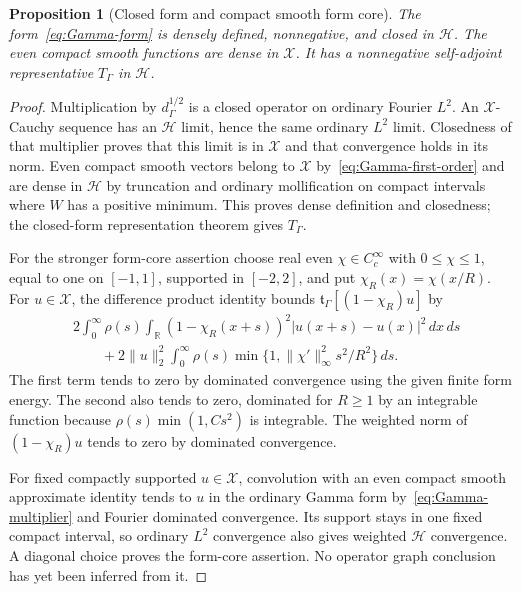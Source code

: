 \documentclass[11pt,a4paper]{article}
\numberwithin{equation}{section}
\newtheorem{proposition}[theorem]{Proposition}
\theoremstyle{definition}
\theoremstyle{remark}
\newcommand{\R}{\mathbb R}
\newcommand{\Hh}{\mathcal H}
\newcommand{\norm}[1]{\lVert #1\rVert}
\begin{document}
\begin{proposition}[Closed form and compact smooth form core]\label{prop:Gamma-form-core}
The form~\eqref{eq:Gamma-form} is densely defined, nonnegative, and closed in $\Hh$. The even compact smooth functions are dense in $\mathcal X$. It has a nonnegative self-adjoint representative $T_\Gamma$ in $\Hh$.
\end{proposition}
\begin{proof}
Multiplication by $d_\Gamma^{1/2}$ is a closed operator on ordinary Fourier $L^2$. An $\mathcal X$-Cauchy sequence has an $\Hh$ limit, hence the same ordinary $L^2$ limit. Closedness of that multiplier proves that this limit is in $\mathcal X$ and that convergence holds in its norm. Even compact smooth vectors belong to $\mathcal X$ by~\eqref{eq:Gamma-first-order} and are dense in $\Hh$ by truncation and ordinary mollification on compact intervals where $W$ has a positive minimum. This proves dense definition and closedness; the closed-form representation theorem gives $T_\Gamma$.

For the stronger form-core assertion choose real even $\chi\in C_c^\infty$ with $0\le\chi\le1$, equal to one on $[-1,1]$, supported in $[-2,2]$, and put $\chi_R(x)=\chi(x/R)$. For $u\in\mathcal X$, the difference product identity bounds $\mathfrak t_\Gamma[(1-\chi_R)u]$ by
\begin{align*}
 &2\int_0^\infty\rho(s)\int_\R
 (1-\chi_R(x+s))^2|u(x+s)-u(x)|^2\,dx\,ds\\
 &\qquad+2\norm{u}_2^2\int_0^\infty\rho(s)
           \min\{1,\norm{\chi'}_\infty^2s^2/R^2\}\,ds.
\end{align*}
The first term tends to zero by dominated convergence using the given finite form energy. The second also tends to zero, dominated for $R\ge1$ by an integrable function because $\rho(s)\min(1,Cs^2)$ is integrable. The weighted norm of $(1-\chi_R)u$ tends to zero by dominated convergence.

For fixed compactly supported $u\in\mathcal X$, convolution with an even compact smooth approximate identity tends to $u$ in the ordinary Gamma form by~\eqref{eq:Gamma-multiplier} and Fourier dominated convergence. Its support stays in one fixed compact interval, so ordinary $L^2$ convergence also gives weighted $\Hh$ convergence. A diagonal choice proves the form-core assertion. No operator graph conclusion has yet been inferred from it.
\end{proof}
\end{document}
